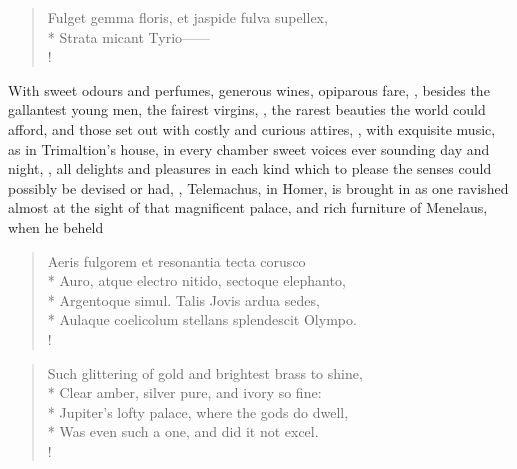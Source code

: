 {\begin{latin}
\begin{verse}%
Fulget gemma floris, et jaspide fulva supellex,\\*
Strata micant Tyrio------\\!
\end{verse}%
\end{latin}

With sweet odours and perfumes, generous wines, opiparous fare, \etc{}, besides the gallantest young men, the fairest virgins, , the rarest beauties the world could afford, and those set out with costly and curious attires, , with exquisite music, as in Trimaltion's house, in every chamber sweet voices ever sounding day and night, , all delights and pleasures in each kind which to please the senses could possibly be devised or had, , \etc{} Telemachus, in Homer, is brought in as one ravished almost at the sight of that magnificent palace, and rich furniture of Menelaus, when he beheld

\begin{latin}
\begin{verse}%
Aeris fulgorem et resonantia tecta corusco\\*
Auro, atque electro nitido, sectoque elephanto,\\*
Argentoque simul. Talis Jovis ardua sedes,\\*
Aulaque coelicolum stellans splendescit Olympo.\\!
\end{verse}%
\end{latin}
\translationrule%
\begin{verse}%
Such glittering of gold and brightest brass to shine,\\*
Clear amber, silver pure, and ivory so fine:\\*
Jupiter's lofty palace, where the gods do dwell,\\*
Was even such a one, and did it not excel.\\!
\end{verse}%

}
